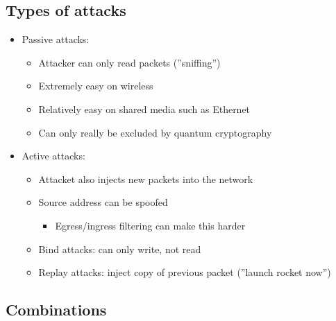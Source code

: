 \documentclass[openany]{book}
\begin{document}
\subsection{Types of attacks}

\begin{itemize}
    \item Passive attacks:
    \begin{itemize}
        \item Attacker can only read packets (''sniffing'')
        \item Extremely easy on wireless
        \item Relatively easy on shared media such as Ethernet
        \item Can only really be excluded by quantum cryptography
    \end{itemize}
    \item Active attacks:
    \begin{itemize}
        \item Attacket also injects new packets into the network
        \item Source address can be spoofed
        \begin{itemize}
            \item Egress/ingress filtering can make this harder
        \end{itemize}
        \item Bind attacks: can only write, not read
        \item Replay attacks: inject copy of previous packet (''launch rocket now'')
    \end{itemize}
\end{itemize}

\subsection{Combinations}
\end{document}
